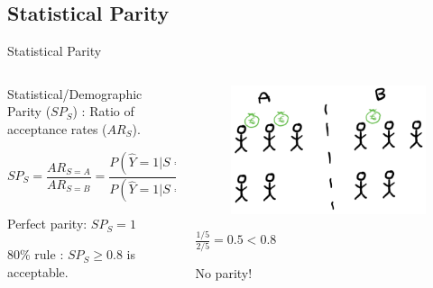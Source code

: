 \documentclass[aspectratio=169]{beamer}
\begin{document}
\subsection{Statistical Parity}
\begin{frame}{Statistical Parity}

\begin{columns} 
    \begin{column}{.5\textwidth}

        Statistical/Demographic Parity 
 ($SP_S$) \cite{hardt2016equalisedodds}: Ratio of acceptance rates ($AR_S$).

        \begin{equation*}
            SP_{S} = \frac{AR_{S=A}}{AR_{S=B}} = \frac{P(\hat{Y}=1|S=A)}{P(\hat{Y}=1|S=B)} 
        \end{equation*}
        
        Perfect parity: $SP_S = 1$
        
        
        80\% rule \cite{feldman2015certifying}: $SP_S \geq 0.8$ is acceptable.

    \end{column}
    
    \begin{column}{.5\textwidth}
    \begin{center}
        \begin{figure}
            \includegraphics[width=.8\textwidth]{img/no_parity.png}
        \end{figure}
        $\frac{1/5}{2/5} = 0.5 < 0.8$
        
        \alert{No parity!}
    \end{center}
        
    \end{column}
    

    \renewcommand{\thefootnote}{\fnsymbol{footnote}}
    
    
\end{columns}
\end{frame}
\end{document}
